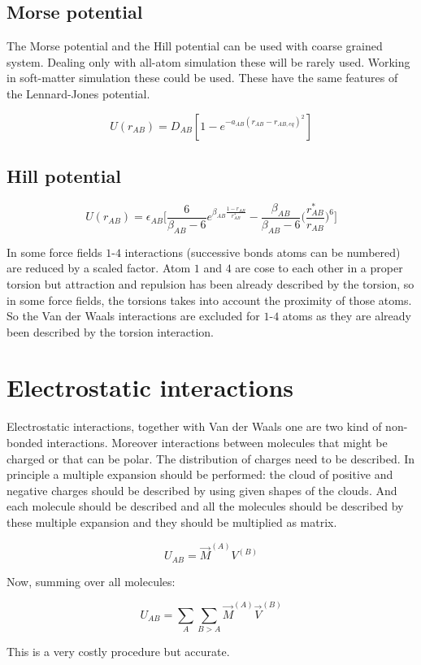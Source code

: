 	\subsection{Morse potential}
	The Morse potential and the Hill potential can be used with coarse grained system.
	Dealing only with all-atom simulation these will be rarely used.
	Working in soft-matter simulation these could be used.
	These have the same features of the Lennard-Jones potential.

	$$U(r_{AB}) = D_{AB}[1-e^{-a_{AB}(r_{AB}-r_{AB,eq})^2}]$$

	\subsection{Hill potential}

	$$U(r_{AB}) = \epsilon_{AB}\biggl[\frac{6}{\beta_{AB}-6}e^{\beta_{AB}\frac{1-r_{AB}}{r^*_{AB}}}-\frac{\beta_{AB}}{\beta_{AB}-6}\biggl(\frac{r^*_{AB}}{r_{AB}}\biggr)^6\biggr]$$

	In some force fields $1$-$4$ interactions (successive bonds atoms can be numbered) are reduced by a scaled factor.
	Atom $1$ and $4$ are cose to each other in a proper torsion but attraction and repulsion has been already described by the torsion, so in some force fields, the torsions takes into account the proximity of those atoms.
	So the Van der Waals interactions are excluded for $1$-$4$ atoms as they are already been described by the torsion interaction.


\section{Electrostatic interactions}
Electrostatic interactions, together with Van der Waals one are two kind of non-bonded interactions.
Moreover interactions between molecules that might be charged or that can be polar.
The distribution of charges need to be described.
In principle a multiple expansion should be performed: the cloud of positive and negative charges should be described by using given shapes of the clouds.
And each molecule should be described and all the molecules should be described by these multiple expansion and they should be multiplied as matrix.

$$U_{AB} = \vec{M}^{(A)}V^{(B)}$$

Now, summing over all molecules:

$$U_{AB} = \sum\limits_{A}\sum\limits_{B>A}\vec{M}^{(A)}\vec{V}^{(B)}$$

This is a very costly procedure but accurate.

